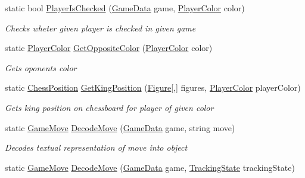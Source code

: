\begin{DoxyCompactItemize}
static bool \mbox{\hyperlink{class_chess_tracking_1_1_game_1_1_game_validator_a7de5a5137a4ad56912ec65a693e36883}{Player\+Is\+Checked}} (\mbox{\hyperlink{class_chess_tracking_1_1_game_1_1_game_data}{Game\+Data}} game, \mbox{\hyperlink{namespace_chess_tracking_1_1_game_ab79070a55977a8c8326e9cdda7dcfa9a}{Player\+Color}} color)
\begin{DoxyCompactList}\small\item\em Checks wheter given player is checked in given game \end{DoxyCompactList}\item 
static \mbox{\hyperlink{namespace_chess_tracking_1_1_game_ab79070a55977a8c8326e9cdda7dcfa9a}{Player\+Color}} \mbox{\hyperlink{class_chess_tracking_1_1_game_1_1_game_validator_a7708ca21ef7efd32215c32570b757668}{Get\+Opposite\+Color}} (\mbox{\hyperlink{namespace_chess_tracking_1_1_game_ab79070a55977a8c8326e9cdda7dcfa9a}{Player\+Color}} color)
\begin{DoxyCompactList}\small\item\em Gets oponents color \end{DoxyCompactList}\item 
static \mbox{\hyperlink{class_chess_tracking_1_1_game_1_1_chess_position}{Chess\+Position}} \mbox{\hyperlink{class_chess_tracking_1_1_game_1_1_game_validator_a6d2d0d1ac5503c09b716bb208a7fc877}{Get\+King\+Position}} (\mbox{\hyperlink{class_chess_tracking_1_1_game_1_1_figure}{Figure}}\mbox{[},\mbox{]} figures, \mbox{\hyperlink{namespace_chess_tracking_1_1_game_ab79070a55977a8c8326e9cdda7dcfa9a}{Player\+Color}} player\+Color)
\begin{DoxyCompactList}\small\item\em Gets king position on chessboard for player of given color \end{DoxyCompactList}\item 
static \mbox{\hyperlink{class_chess_tracking_1_1_game_1_1_game_move}{Game\+Move}} \mbox{\hyperlink{class_chess_tracking_1_1_game_1_1_game_validator_ae388315a03f9b3e37296d94f5bb04ca0}{Decode\+Move}} (\mbox{\hyperlink{class_chess_tracking_1_1_game_1_1_game_data}{Game\+Data}} game, string move)
\begin{DoxyCompactList}\small\item\em Decodes textual representation of move into object \end{DoxyCompactList}\item 
static \mbox{\hyperlink{class_chess_tracking_1_1_game_1_1_game_move}{Game\+Move}} \mbox{\hyperlink{class_chess_tracking_1_1_game_1_1_game_validator_ae8a8e271e382bb27e307a8ccd6f2d3af}{Decode\+Move}} (\mbox{\hyperlink{class_chess_tracking_1_1_game_1_1_game_data}{Game\+Data}} game, \mbox{\hyperlink{class_chess_tracking_1_1_multithreading_messages_1_1_tracking_state}{Tracking\+State}} tracking\+State)

\end{DoxyCompactItemize}
